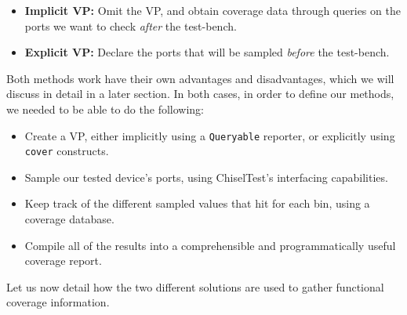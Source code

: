 \documentclass[conference]{IEEEtran}
\begin{document}
\begin{itemize}
	\item \textbf{Implicit VP:} Omit the VP, and obtain coverage data through queries on the ports we want to check \emph{after} the test-bench.
	\item \textbf{Explicit VP:} Declare the ports that will be sampled \emph{before} the test-bench.
\end{itemize}

Both methods work have their own advantages and disadvantages, which we will discuss in detail in a later section.
In both cases, in order to define our methods, we needed to be able to do the following:

\begin{itemize}
  \item Create a VP, either implicitly using a \texttt{Queryable} reporter, or explicitly using \texttt{cover} constructs.
  \item Sample our tested device's ports, using ChiselTest's interfacing capabilities.
  \item Keep track of the different sampled values that hit for each bin, using a coverage database.
  \item Compile all of the results into a comprehensible and programmatically useful coverage report.
\end{itemize}

Let us now detail how the two different solutions are used to gather functional coverage information.
\end{document}

